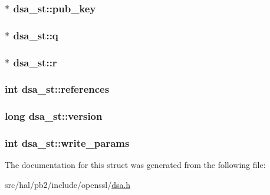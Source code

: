 \subsubsection[{\texorpdfstring{pub\+\_\+key}{pub_key}}]{$\ast$ dsa\+\_\+st\+::pub\+\_\+key}\hypertarget{structdsa__st_a2a844d480ca7c1a73dadeee215863fa6}{}\label{structdsa__st_a2a844d480ca7c1a73dadeee215863fa6}
\subsubsection[{\texorpdfstring{q}{q}}]{$\ast$ dsa\+\_\+st\+::q}\hypertarget{structdsa__st_ab0cae8e320e604e2f4d18066bb02a097}{}\label{structdsa__st_ab0cae8e320e604e2f4d18066bb02a097}
\subsubsection[{\texorpdfstring{r}{r}}]{$\ast$ dsa\+\_\+st\+::r}\hypertarget{structdsa__st_ab301cd06470fbfae28764c2115b60d97}{}\label{structdsa__st_ab301cd06470fbfae28764c2115b60d97}
\subsubsection[{\texorpdfstring{references}{references}}]{\setlength{\rightskip}{0pt plus 5cm}int dsa\+\_\+st\+::references}\hypertarget{structdsa__st_a4a1337f8a116a7f1b322639edfa9d580}{}\label{structdsa__st_a4a1337f8a116a7f1b322639edfa9d580}
\subsubsection[{\texorpdfstring{version}{version}}]{\setlength{\rightskip}{0pt plus 5cm}long dsa\+\_\+st\+::version}\hypertarget{structdsa__st_a9aa35c728a9166c0671f4286f7f367cc}{}\label{structdsa__st_a9aa35c728a9166c0671f4286f7f367cc}
\subsubsection[{\texorpdfstring{write\+\_\+params}{write_params}}]{\setlength{\rightskip}{0pt plus 5cm}int dsa\+\_\+st\+::write\+\_\+params}\hypertarget{structdsa__st_a4b48d1347fa55e2f68cc991d98c2daf2}{}\label{structdsa__st_a4b48d1347fa55e2f68cc991d98c2daf2}


The documentation for this struct was generated from the following file\+:\begin{DoxyCompactItemize}
\item 
src/hal/pb2/include/openssl/\hyperlink{dsa_8h}{dsa.\+h}\end{DoxyCompactItemize}
